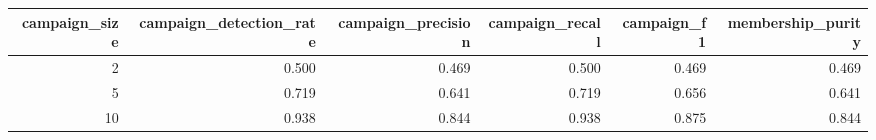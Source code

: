 \begin{tabular}{rrrrrr}
\toprule
campaign_size & campaign_detection_rate & campaign_precision & campaign_recall & campaign_f1 & membership_purity \\
\midrule
2 & 0.500 & 0.469 & 0.500 & 0.469 & 0.469 \\
5 & 0.719 & 0.641 & 0.719 & 0.656 & 0.641 \\
10 & 0.938 & 0.844 & 0.938 & 0.875 & 0.844 \\
\bottomrule
\end{tabular}

